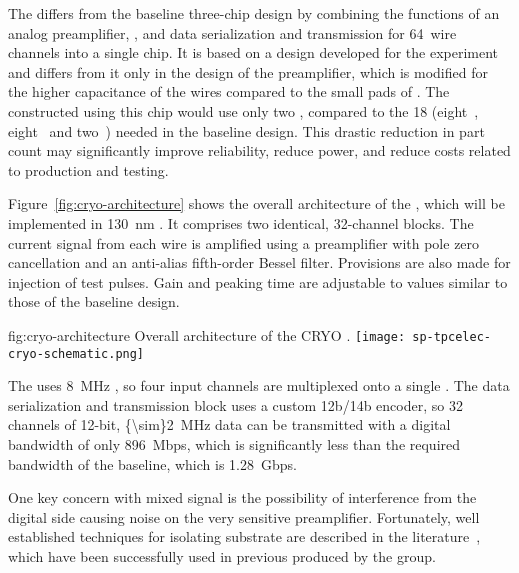 The    differs from the baseline 
three-chip design by combining the functions of an analog 
preamplifier, , and data serialization and transmission 
for \num{64}~wire channels into a single chip. It is based on a design 
developed for the  experiment~\cite{nEXO} and differs from 
it only in the design of the preamplifier, which is modified for the 
higher capacitance of the   wires compared 
to the small pads of . The  constructed using 
this chip would use only two , compared to the \num{18} 
(eight~, eight~ and two~) needed 
in the baseline design. This drastic reduction in part count may 
significantly improve  reliability, reduce power, and reduce 
costs related to production and testing. 

Figure~\ref{fig:cryo-architecture} shows the overall architecture of 
the  , which will be implemented in 
\SI{130}{nm} . It comprises two identical, \num{32}-channel 
blocks. The current signal from each wire is amplified using a preamplifier 
with pole zero cancellation and an anti-alias fifth-order Bessel filter. 
Provisions are also made for injection of test pulses. Gain and peaking 
time are adjustable to values similar to those of the baseline design.

\begin{dunefigure}
{fig:cryo-architecture}
{Overall architecture of the CRYO .}
\texttt{[image: sp-tpcelec-cryo-schematic.png]}
\end{dunefigure}

The  uses \SI{8}{MHz} , so four input channels are 
multiplexed onto a single . The data serialization and transmission 
block uses a custom 12b/14b encoder, so \num{32} channels of \num{12}-bit, 
\SI{{\sim}2}{MHz} data can be transmitted with a digital bandwidth of 
only \SI{896}{Mbps}, which is significantly less than the required bandwidth 
of the baseline, which is \SI{1.28}{Gbps}.

One key concern with mixed signal  is the possibility of 
interference from the digital side causing noise on the very sensitive preamplifier. 
Fortunately, well established techniques for isolating substrate are 
described in the literature~\cite{yeh}, which have been successfully 
used in previous  produced by the  group.

